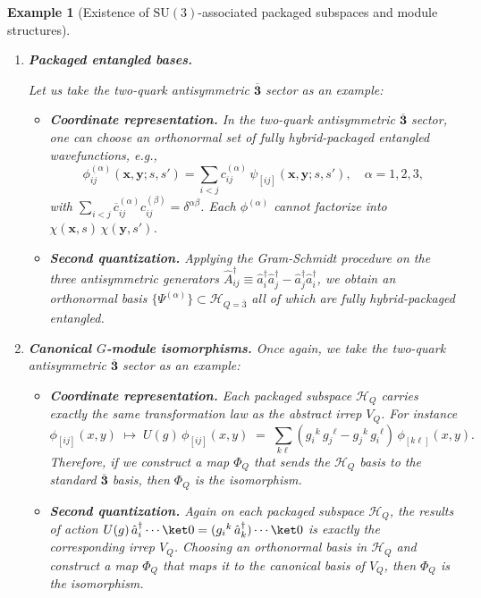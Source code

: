 \documentclass[12pt,a4paper]{article}
\newtheorem{example}{Example}
\begin{document}
\begin{example}[Existence of $\mathrm{SU}(3)$-associated packaged subspaces and module structures]
\begin{enumerate}
		
		\item \textbf{Packaged entangled bases.}
		
		Let us take the two-quark antisymmetric $\overline{\mathbf3}$ sector as an example:
		\begin{itemize}
			\item \textbf{Coordinate representation.}
			In the two-quark antisymmetric $\overline{\mathbf3}$ sector, one can choose an orthonormal set of fully hybrid-packaged entangled wavefunctions, e.g.,
			$$
			\phi^{(\alpha)}_{ij}(\mathbf x,\mathbf y;s,s')
			=\sum_{i<j}c^{(\alpha)}_{ij}\,\psi_{[ij]}(\mathbf x,\mathbf y;s,s'),
			\quad
			\alpha=1,2,3,
			$$
			with $\sum_{i<j}\overline{c}^{(\alpha)}_{ij}c^{(\beta)}_{ij}=\delta^{\alpha\beta}$.  Each $\phi^{(\alpha)}$ cannot factorize into $\chi(\mathbf x,s)\,\chi(\mathbf y,s')$.
			
			\item \textbf{Second quantization.}
			Applying the Gram-Schmidt procedure on the three antisymmetric generators
			$\hat A^\dagger_{ij}\equiv\hat a_i^\dagger\hat a_j^\dagger-\hat a_j^\dagger\hat a_i^\dagger$, we obtain an orthonormal basis
			$\{\Psi^{(\alpha)}\}\subset\mathcal H_{Q=\overline3}$ all of which are fully hybrid-packaged entangled.
		\end{itemize}
		
		
		\item \textbf{Canonical $G$-module isomorphisms.}
		Once again, we take the two-quark antisymmetric $\overline{\mathbf3}$ sector as an example:
		\begin{itemize}
			\item \textbf{Coordinate representation.}
			Each packaged subspace $\mathcal H_Q$ carries exactly the same transformation law as the abstract irrep $V_Q$.
			For instance
			$$
			\phi_{[ij]}(x,y)\;\mapsto\;
			U(g)\,\phi_{[ij]}(x,y)\;=\;
			\sum_{k\ell}(g_i{}^k\,g_j{}^\ell-g_j{}^k\,g_i{}^\ell)\,\phi_{[k\ell]}(x,y).
			$$		
			Therefore, if we construct a map $\Phi_Q$ that sends the $\mathcal H_Q$ basis to the standard $\overline{\mathbf3}$ basis, then $\Phi_Q$ is the isomorphism.
			
			\item \textbf{Second quantization.}
			Again on each packaged subspace $\mathcal H_Q$, the results of action
			$U(g)\,\hat a_i^\dagger\cdots\ket0 = (g_i{}^k\,\hat a_k^\dagger)\cdots\ket0$
			is exactly the corresponding irrep $V_Q$.
			Choosing an orthonormal basis in $\mathcal H_Q$ and construct a map $\Phi_Q$ that maps it to the canonical basis of $V_Q$, then $\Phi_Q$ is the isomorphism.
		\end{itemize}
		

\end{enumerate}
\end{example}
\end{document}
